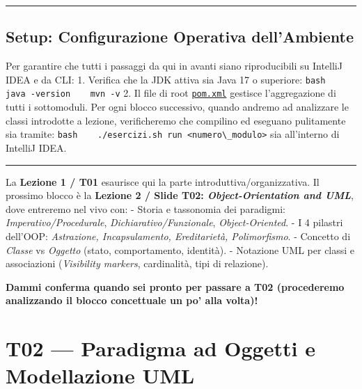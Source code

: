 \documentclass[11pt,a4paper,oneside]{report}
\newcommand{\passthrough}[1]{#1}
\begin{document}
\begin{center}\rule{0.5\linewidth}{0.5pt}\end{center}

\section{Setup: Configurazione Operativa
dell'Ambiente}\label{chap01_setup-configurazione-operativa-dellambiente}

Per garantire che tutti i passaggi da qui in avanti siano riproducibili
su IntelliJ IDEA e da CLI: 1. Verifica che la JDK attiva sia Java 17 o
superiore: \passthrough{\lstinline!bash    java -version    mvn -v!} 2.
Il file di root
\href{file:///home/wally/Documenti/GitHub/Programmazione-II/25-26/esercizi-wally-25-26/pom.xml}{\passthrough{\lstinline!pom.xml!}}
gestisce l'aggregazione di tutti i sottomoduli. Per ogni blocco
successivo, quando andremo ad analizzare le classi introdotte a lezione,
verificheremo che compilino ed eseguano pulitamente sia tramite:
\passthrough{\lstinline!bash    ./esercizi.sh run <numero\_modulo>!} sia
all'interno di IntelliJ IDEA.

\begin{center}\rule{0.5\linewidth}{0.5pt}\end{center}

\begin{studynote} La \textbf{Lezione 1 / T01} esaurisce qui la parte
introduttiva/organizzativa. Il prossimo blocco è la \textbf{Lezione 2 /
Slide T02: \emph{Object-Orientation and UML}}, dove entreremo nel vivo
con: - Storia e tassonomia dei paradigmi: \emph{Imperativo/Procedurale},
\emph{Dichiarativo/Funzionale}, \emph{Object-Oriented}. - I 4 pilastri
dell'OOP: \emph{Astrazione, Incapsulamento, Ereditarietà, Polimorfismo}.
- Concetto di \emph{Classe} vs \emph{Oggetto} (stato, comportamento,
identità). - Notazione UML per classi e associazioni (\emph{Visibility
markers}, cardinalità, tipi di relazione).
\end{studynote}

\textbf{Dammi conferma quando sei pronto per passare a T02 (procederemo
analizzando il blocco concettuale un po' alla volta)!}

\newpage
\chapter[T02 --- Paradigma ad Oggetti e Modellazione]{T02 --- Paradigma ad Oggetti e Modellazione UML}
\label{chap:t02}
\end{document}
